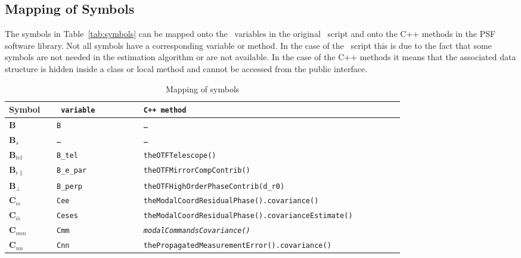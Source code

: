 \documentclass[a4paper]{article}
\begin{document}
\subsection{Mapping of Symbols}
The symbols in Table~\ref{tab:symbols} can be mapped onto the \Matlab\
variables in the original \Matlab\ script and onto the C++ methods in the PSF
software library. Not all symbols have a corresponding variable or method. In
the case of the \Matlab\ script this is due to the fact that some symbols are
not needed in the estimation algorithm or are not available. In the case of
the C++ methods it means that the associated data structure is hidden inside a
class or local method and cannot be accessed from the public interface.

\begin{table}[ht]
\caption{\label{tab:mapping}Mapping of symbols}
\begin{minipage}{\linewidth}
\renewcommand{\thempfootnote}{\fnsymbol{mpfootnote}}
\begin{tabular}{p{0.1\linewidth}
                >{\tt}p{0.2\linewidth} >{\tt}p{0.61\linewidth}}
                                                                             \\
Symbol       & {\rm \Matlab\ variable} & {\rm C++ method\mpfootnotemark}     \\
\hline
$\mathbf{B}$               & B         & \ldots                              \\
$\mathbf{B}_s$             & \ldots    & \ldots                              \\
$\mathbf{B}_{tel}$         & B\_tel    & theOTFTelescope()                   \\
$\mathbf{B}_{\epsilon\parallel}$  
                           & B\_e\_par & theOTFMirrorCompContrib()           \\
$\mathbf{B}_{\perp}$       & B\_perp   & theOTFHighOrderPhaseContrib(d\_r0)  \\
$\mathbf{C}_{\epsilon\epsilon}$
                           & Cee
                           & theModalCoordResidualPhase().covariance()       \\
$\mathbf{C}_{\hat{\epsilon}\hat{\epsilon}}$
                           & Ceses     &
                           theModalCoordResidualPhase().covarianceEstimate() \\
$\mathbf{C}_{mm}$          & Cmm       & {\em modalCommandsCovariance()}     \\
$\mathbf{C}_{nn}$          & Cnn        
                           & thePropagatedMeasurementError().covariance()    \\

\end{tabular}
\end{minipage}
\end{table}
\end{document}
